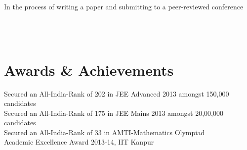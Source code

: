 \documentclass[mm]{simple_style}
\begin{document}
\begin{resume}
{	In the process of writing a paper and submitting to a peer-reviewed conference\\
}
\vspace{2ex}\\
\\
\vspace{1ex}
\\

\sectionline

\section{Awards \& Achievements}
Secured an All-India-Rank of 202 in JEE Advanced 2013 amongst 150,000 candidates\\
Secured an All-India-Rank of 175 in JEE Mains 2013 amongst 20,00,000 candidates\\
Secured an All-India-Rank of 33 in AMTI-Mathematics Olympiad\\
Academic Excellence Award 2013-14, IIT Kanpur

\sectionline

\newpage
\sectionline


\end{resume}
\end{document}
